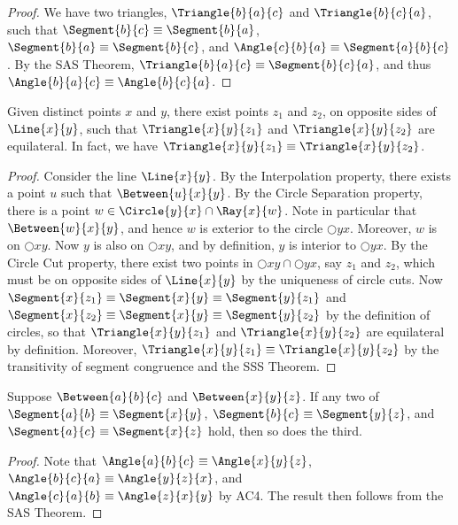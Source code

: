 \documentclass{article}
\begin{document}
\begin{proof}
We have two triangles, $\Triangle{b}{a}{c}$ and $\Triangle{b}{c}{a}$, such that $\Segment{b}{c}\equiv \Segment{b}{a}$, $\Segment{b}{a} \equiv \Segment{b}{c}$, and $\Angle{c}{b}{a} \equiv \Segment{a}{b}{c}$. By the SAS Theorem, $\Triangle{b}{a}{c} \equiv \Segment{b}{c}{a}$, and thus $\Angle{b}{a}{c} \equiv \Angle{b}{c}{a}$.
\end{proof}

\begin{construct}
Given distinct points $x$ and $y$, there exist points $z_1$ and $z_2$, on opposite sides of $\Line{x}{y}$, such that $\Triangle{x}{y}{z_1}$ and $\Triangle{x}{y}{z_2}$ are equilateral. In fact, we have $\Triangle{x}{y}{z_1} \equiv \Triangle{x}{y}{z_2}$.
\end{construct}

\begin{proof}
Consider the line $\Line{x}{y}$. By the Interpolation property, there exists a point $u$ such that $\Between{u}{x}{y}$. By the Circle Separation property, there is a point $w \in \Circle{y}{x} \cap \Ray{x}{w}$. Note in particular that $\Between{w}{x}{y}$, and hence $w$ is exterior to the circle $\Circle{y}{x}$. Moreover, $w$ is on $\Circle{x}{y}$. Now $y$ is also on $\Circle{x}{y}$, and by definition, $y$ is interior to $\Circle{y}{x}$. By the Circle Cut property, there exist two points in $\Circle{x}{y} \cap \Circle{y}{x}$, say $z_1$ and $z_2$, which must be on opposite sides of $\Line{x}{y}$ by the uniqueness of circle cuts. Now $\Segment{x}{z_1} \equiv \Segment{x}{y} \equiv \Segment{y}{z_1}$ and $\Segment{x}{z_2} \equiv \Segment{x}{y} \equiv \Segment{y}{z_2}$ by the definition of circles, so that $\Triangle{x}{y}{z_1}$ and $\Triangle{x}{y}{z_2}$ are equilateral by definition. Moreover, $\Triangle{x}{y}{z_1} \equiv \Triangle{x}{y}{z_2}$ by the transitivity of segment congruence and the SSS Theorem.
\end{proof}

\begin{prop}
Suppose $\Between{a}{b}{c}$ and $\Between{x}{y}{z}$. If any two of $\Segment{a}{b} \equiv \Segment{x}{y}$, $\Segment{b}{c} \equiv \Segment{y}{z}$, and $\Segment{a}{c} \equiv \Segment{x}{z}$ hold, then so does the third.
\end{prop}

\begin{proof}
Note that $\Angle{a}{b}{c} \equiv \Angle{x}{y}{z}$, $\Angle{b}{c}{a} \equiv \Angle{y}{z}{x}$, and $\Angle{c}{a}{b} \equiv \Angle{z}{x}{y}$ by AC4. The result then follows from the SAS Theorem.
\end{proof}
\end{document}
